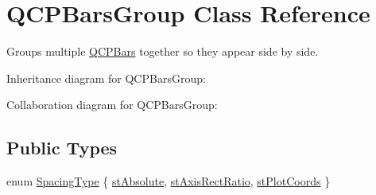 \hypertarget{classQCPBarsGroup}{}\section{Q\+C\+P\+Bars\+Group Class Reference}
\label{classQCPBarsGroup}


Groups multiple \hyperlink{classQCPBars}{Q\+C\+P\+Bars} together so they appear side by side.  




Inheritance diagram for Q\+C\+P\+Bars\+Group\+:


Collaboration diagram for Q\+C\+P\+Bars\+Group\+:
\subsection*{Public Types}
\begin{DoxyCompactItemize}
\item 
enum \hyperlink{classQCPBarsGroup_a4c0521120a97e60bbca37677a37075b6}{Spacing\+Type} \{ \hyperlink{classQCPBarsGroup_a4c0521120a97e60bbca37677a37075b6ab53fa3efaf14867dd0f14d41d64e42ac}{st\+Absolute}, 
\hyperlink{classQCPBarsGroup_a4c0521120a97e60bbca37677a37075b6ae94b05c27bc985dcdd8b1e1b7f163d26}{st\+Axis\+Rect\+Ratio}, 
\hyperlink{classQCPBarsGroup_a4c0521120a97e60bbca37677a37075b6ad369cee6287e0a86e8c2b643a3168c54}{st\+Plot\+Coords}
 \}
\end{DoxyCompactItemize}
